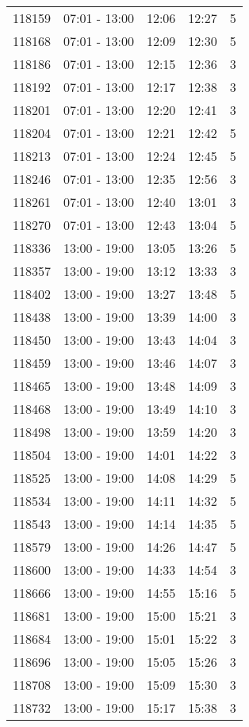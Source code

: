 \documentclass{article}
\begin{document}
\begin{tabular}{llccc}
118159 & 07:01 - 13:00 & 12:06 & 12:27 & 5 \\
118168 & 07:01 - 13:00 & 12:09 & 12:30 & 5 \\
118186 & 07:01 - 13:00 & 12:15 & 12:36 & 3 \\
118192 & 07:01 - 13:00 & 12:17 & 12:38 & 3 \\
118201 & 07:01 - 13:00 & 12:20 & 12:41 & 3 \\
118204 & 07:01 - 13:00 & 12:21 & 12:42 & 5 \\
118213 & 07:01 - 13:00 & 12:24 & 12:45 & 5 \\
118246 & 07:01 - 13:00 & 12:35 & 12:56 & 3 \\
118261 & 07:01 - 13:00 & 12:40 & 13:01 & 3 \\
118270 & 07:01 - 13:00 & 12:43 & 13:04 & 5 \\
118336 & 13:00 - 19:00 & 13:05 & 13:26 & 5 \\
118357 & 13:00 - 19:00 & 13:12 & 13:33 & 3 \\
118402 & 13:00 - 19:00 & 13:27 & 13:48 & 5 \\
118438 & 13:00 - 19:00 & 13:39 & 14:00 & 3 \\
118450 & 13:00 - 19:00 & 13:43 & 14:04 & 3 \\
118459 & 13:00 - 19:00 & 13:46 & 14:07 & 3 \\
118465 & 13:00 - 19:00 & 13:48 & 14:09 & 3 \\
118468 & 13:00 - 19:00 & 13:49 & 14:10 & 3 \\
118498 & 13:00 - 19:00 & 13:59 & 14:20 & 3 \\
118504 & 13:00 - 19:00 & 14:01 & 14:22 & 3 \\
118525 & 13:00 - 19:00 & 14:08 & 14:29 & 5 \\
118534 & 13:00 - 19:00 & 14:11 & 14:32 & 5 \\
118543 & 13:00 - 19:00 & 14:14 & 14:35 & 5 \\
118579 & 13:00 - 19:00 & 14:26 & 14:47 & 5 \\
118600 & 13:00 - 19:00 & 14:33 & 14:54 & 3 \\
118666 & 13:00 - 19:00 & 14:55 & 15:16 & 5 \\
118681 & 13:00 - 19:00 & 15:00 & 15:21 & 3 \\
118684 & 13:00 - 19:00 & 15:01 & 15:22 & 3 \\
118696 & 13:00 - 19:00 & 15:05 & 15:26 & 3 \\
118708 & 13:00 - 19:00 & 15:09 & 15:30 & 3 \\
118732 & 13:00 - 19:00 & 15:17 & 15:38 & 3 \\

\end{tabular}
\end{document}
